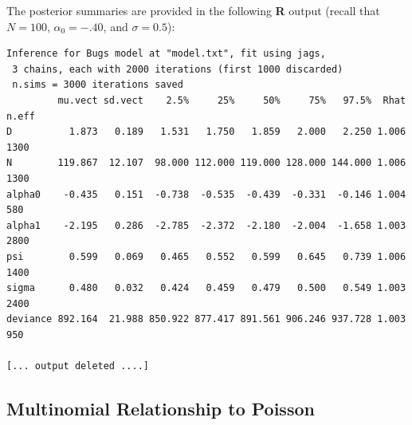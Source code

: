The posterior summaries are provided in the following {\bf R}
output (recall that
$N=100$, $\alpha_{0}= -.40$, and $\sigma=0.5$):
{\small
\begin{verbatim}
Inference for Bugs model at "model.txt", fit using jags,
 3 chains, each with 2000 iterations (first 1000 discarded)
 n.sims = 3000 iterations saved
         mu.vect sd.vect    2.5%     25%     50%     75%   97.5%  Rhat n.eff
D          1.873   0.189   1.531   1.750   1.859   2.000   2.250 1.006  1300
N        119.867  12.107  98.000 112.000 119.000 128.000 144.000 1.006  1300
alpha0    -0.435   0.151  -0.738  -0.535  -0.439  -0.331  -0.146 1.004   580
alpha1    -2.195   0.286  -2.785  -2.372  -2.180  -2.004  -1.658 1.003  2800
psi        0.599   0.069   0.465   0.552   0.599   0.645   0.739 1.006  1400
sigma      0.480   0.032   0.424   0.459   0.479   0.500   0.549 1.003  2400
deviance 892.164  21.988 850.922 877.417 891.561 906.246 937.728 1.003   950

[... output deleted ....]
\end{verbatim}
}


\subsection{Multinomial Relationship to Poisson}

